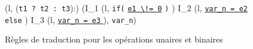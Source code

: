 \begin{figure*}[bt]
{    {
      {
        (l, (\mbox{\lstinline't1 ? t2 : t3'}):)
        (I_1
        \concat (l,
        \mbox{\lstinline'if('}
        \underline{\mbox{\lstinline'e1'}\Zclear \mbox{\lstinline' \!= 0'}}
        \mbox{\lstinline')'} \bopen
        )
        \concat I_2
        \concat (l,
        \underline{\Zinit \mbox{\lstinline'var_n = e2'} \Zclear}
        \semicolon \bclose
        \mbox{\lstinline'else'} \bopen
        )
        \concat I_3
        \concat
        (l,
        \underline{\Zinit \mbox{\lstinline'var_n = e3'} \Zclear}
        \semicolon
        \bclose ),
        \mbox{\lstinline'var_n'})
      }
    }
  }
  \caption{Règles de traduction pour les opérations unaires et binaires}
  \label{fig:op}
\end{figure*}


